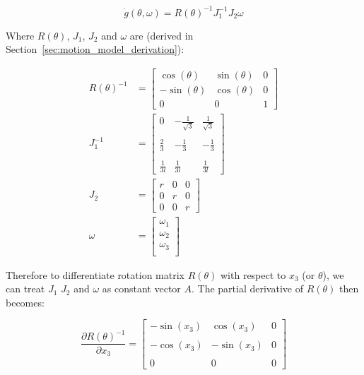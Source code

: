 \documentclass{article}
\begin{document}
\begin{equation}
    \dot{g}(\theta, \omega) = R(\theta)^{-1} J_{1}^{-1} J_{2} \omega
\end{equation}


Where $R(\theta)$, $J_{1}$, $J_{2}$ and $\omega$ are (derived in 
Section~\ref{sec:motion_model_derivation}): 

\begin{align}
	R(\theta)^{-1} &= 
 	\begin{bmatrix}
	    \cos{(\theta)} & \sin{(\theta)} & 0 \\
	    -\sin{(\theta)} & \cos{(\theta)} & 0 \\
	    0 & 0 & 1
    \end{bmatrix} \\
	J_{1}^{-1} &= 
	\begin{bmatrix}
		0 & -\frac{1}{\sqrt{3}} & \frac{1}{\sqrt{3}} \\ \\
		\frac{2}{3} & -\frac{1}{3} & -\frac{1}{3} \\ \\
		\frac{1}{3l} & \frac{1}{3l} & \frac{1}{3l}
	\end{bmatrix} \\
    J_{2} &=
    \begin{bmatrix}
        r & 0 & 0 \\
        0 & r & 0 \\
        0 & 0 & r
    \end{bmatrix} \\
    \omega &= 
	    \begin{bmatrix}
	       \omega_{1} \\
	       \omega_{2} \\
	       \omega_{3} \\
	    \end{bmatrix}
\end{align}

Therefore to differentiate rotation matrix $R(\theta)$ with respect to $x_{3}$ 
(or $\theta$), we can treat $J_{1}$ $J_{2}$ and $\omega$ as constant vector 
$A$. The partial derivative of $R(\theta)$ then becomes:

\begin{equation}
	\dfrac{\partial R(\theta)^{-1}}{\partial x_{3}} = 
	\begin{bmatrix}
		-\sin(x_{3}) & \cos(x_{3}) & 0 \\ \\
		-\cos(x_{3}) & -\sin(x_{3}) & 0 \\ \\
		0 & 0 & 0
	\end{bmatrix}
\end{equation}
\end{document}
